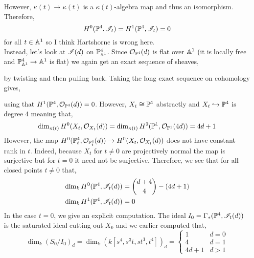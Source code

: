 \documentclass[12pt]{article}
\begin{document}
\begin{center}
\end{center}
However, $\kappa(t) \to \kappa(t)$ is a $\kappa(t)$-algebra map and thus an isomorphism. Therefore,
\[ H^0(\P^4, \I_t) = H^1(\P^4, \I_t) = 0 \]
for all $t \in \A^1$ so I think Hartshorne is wrong here.
\bigskip\\
Instead, let's look at $\I(d)$ on $\P^4_{\A^1}$. Since $\struct{\P^4}(d)$ is flat over $\A^1$ (it is locally free and $\P^4_{\A^1} \to \A^1$ is flat) we again get an exact sequence of sheaves,
\begin{center}
\end{center}
by twisting and then pulling back. Taking the long exact sequence on cohomology gives,
\begin{center}
\end{center}
using that $H^1(\P^4, \struct{\P^4}(d)) = 0$. However, $X_t \cong \P^1$ abstractly and $X_t \embed \P^4$ is degree $4$ meaning that,
\[ \dim_{\kappa(t)} H^0(X_t, \struct{X_t}(d)) = \dim_{\kappa(t)} H^0(\P^1, \struct{\P^1}(4d)) = 4 d + 1 \]
However, the map $H^0(\P^4_t, \struct{\P^4_t}(d)) \to H^0(X_t, \struct{X_t}(d))$ does not have constant rank in $t$. Indeed, because $X_t$ for $t \neq 0$ are projectively normal the map is surjective but for $t = 0$ it need not be surjective. Therefore, we see that for all closed points $t \neq 0$ that,
\begin{align*}
\dim_{k} H^0(\P^4, \I_t(d)) &= { d + 4 \choose 4} - (4 d + 1)
\\
\dim_{k} H^1(\P^4, \I_t(d)) & = 0
\end{align*} 
In the case $t = 0$, we give an explicit computation. The ideal $I_0 = \Gamma_*(\P^4, \I_t(d))$ is the saturated ideal cutting out $X_0$ and we earlier computed that,
\[ \dim_{k} (S_0 / I_0)_d = \dim_k (k[s^4, s^3 t, s t^3, t^4])_d = 
\begin{cases}
1 & d = 0
\\
4 & d = 1
\\
4 d + 1 & d > 1
\end{cases} \]
\end{document}
